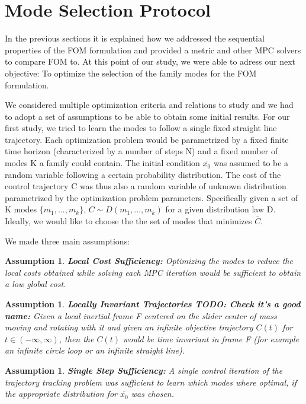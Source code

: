 \documentclass[12,twoside]{TFG-GM}
\newtheorem{assumption}[theorem]{Assumption}
\theoremstyle{definition}
\theoremstyle{remark}
\newcommand*\mean[1]{\bar{#1}}
\newcommand*\diff[1]{\bar{#1}}
\begin{document}
\section{Mode Selection Protocol}
\label{sec:modeselection}
In the previous sections it is explained how we addressed the sequential properties of the FOM formulation and provided a metric and other MPC solvers to compare FOM to. At this point of our study, we were able to adress our next objective: To optimize the selection of the family modes for the FOM formulation.

We considered multiple optimization criteria and relations to study and we had to adopt a set of assumptions to be able to obtain some initial results. For our first study, we tried to learn the modes to follow a single fixed straight line trajectory. Each optimization problem would be parametrized by a fixed finite time horizon (characterized by a number of steps N) and a fixed number of modes K a family could contain. The initial condition $\diff{x_0}$ was assumed to be a random variable following a certain probability distribution. The cost of the control trajectory C was thus also a random variable of unknown distribution parametrized by the optimization problem parameters. Specifically given a set of K modes $\{m_1, ..., m_k\}$, $C \sim D(m_1, ..., m_k)$ for a given distribution law D. Ideally, we would like to choose the the set of modes that minimizes $\mean{C}$.

We made three main assumptions:
\begin{assumption} \label{ass:localcost}
\textbf{Local Cost Sufficiency:} Optimizing the modes to reduce the local costs obtained while solving each MPC iteration would be sufficient to obtain a low global cost.
\end{assumption}
\begin{assumption} \label{ass:localinv}
\textbf{Locally Invariant Trajectories TODO: Check it's a good name:} Given a local inertial frame F centered on the slider center of mass moving and rotating with it and given an infinite objective trajectory $C(t)$ for $t \in (-\infty, \infty)$, then the $C(t)$ would be time invariant in frame F (for example an infinite circle loop or an infinite straight line).
\end{assumption}
\begin{assumption} \label{ass:singlestep}
\textbf{Single Step Sufficiency:} A single control iteration of the trajectory tracking problem was sufficient to learn which modes where optimal, if the appropriate distribution for $\diff{x_0}$ was chosen.
\end{assumption} 
\end{document}
